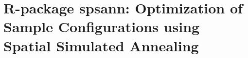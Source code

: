 \artigofalse
\chapter{R-package spsann: Optimization of Sample Configurations using Spatial Simulated Annealing}
\label{apen:spsann}

